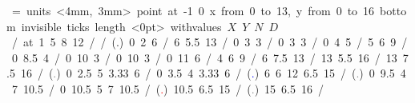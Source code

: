 \mbox{\beginpicture
\headingtoplotskip=\baselineskip
\setcoordinatesystem units <4mm, 3mm> point at -1 0
\setplotarea x from 0 to 13, y from 0 to 16
\axis bottom invisible ticks length <0pt>
  withvalues {$X$} {$Y$} {$N$} {$D$} /  at 1 5 8 12 / /
\setplotsymbol ({\normalsize .})
 0 2 6 / %
 6 5.5 13 / %
 0 3 3 / %
 0 3 3 / %
 0 4 5 / %
 5 6 9 / %
 0 8.5 4 / %
 0 10 3 / %
 0 10 3 / %
 0 11 6 / %
 4 6 9 / %
 6 7.5 13 / %
 13 5.5 16 / %
 13 7.5 16 / %
\setplotsymbol ({\textcolor{gray}{\scriptsize .}})
 0 2.5 5 3.33 6 / %
 0 3.5 4 3.33 6 / %
\setplotsymbol ({\textcolor{blue}{\scriptsize .}})
 6 6 12 6.5 15 / %
\setplotsymbol ({\textcolor{gray}{\scriptsize .}})
 0 9.5 4 7 10.5 / %
 0 10.5 5 7 10.5 / %
\setplotsymbol ({\textcolor{red}{\scriptsize .}})
 10.5 6.5 15 / %
\setplotsymbol ({\textcolor{gray}{\scriptsize .}})
 15 6.5 16 / %
\endpicture}
